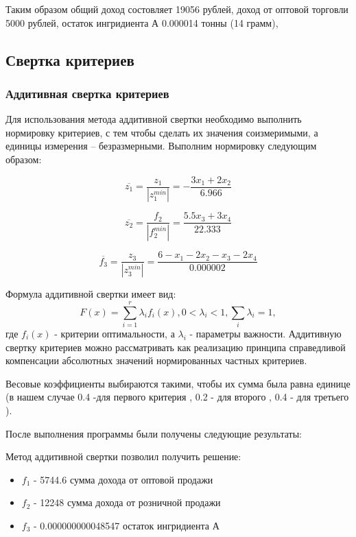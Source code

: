 \documentclass[14pt,a4paper,report]{report}
\begin{document}
Таким образом общий доход состовляет 19056 рублей, доход от оптовой торговли 5000 рублей, остаток ингридиента А 0.000014 тонны (14 грамм),




\subsection{Свертка критериев}
\subsubsection{Аддитивная свертка критериев}
Для использования метода аддитивной свертки необходимо выполнить нормировку критериев, с тем чтобы сделать их значения соизмеримыми, а единицы измерения – безразмерными. Выполним нормировку следующим образом:


    
    
\begin{equation}
\overline{z_1} = \frac{z_1}{|z_1^{min}|} =
-\frac{3x_1 + 2x_2}{6.966}
\end{equation}

\begin{equation}
\overline{z_2} = \frac{f_2}{|f_2^{min}|} = \frac{5.5x_3 + 3x_4} {22.333} 
\end{equation}

\begin{equation}
\overline{f_3} = \frac{z_3}{|z_3^{min}|} = \frac{6 - x_1 - 2x_2 - x_3 - 2x_4 }{0.000002} 
\end{equation}

Формула аддитивной свертки имеет вид:
\begin{equation}
F(x) = \sum_{i=1}^{r}\lambda_i f_i(x), 0<\lambda_i<1, \sum_i^{}\lambda_i=1,
\end{equation}
где $f_i(x)$ - критерии оптимальности, а $\lambda_i$ - параметры важности. 
Аддитивную свертку критериев можно рассматривать как реализацию принципа справедливой компенсации абсолютных значений нормированных частных критериев.

Весовые коэффициенты  выбираются такими, чтобы их сумма была равна единице (в нашем случае 0.4 -для первого критерия , 0.2 - для второго , 0.4 - для третьего ).



После выполнения программы были получены следующие результаты:



Метод аддитивной свертки позволил получить решение:
\begin{itemize}
\item $f_1$ - 5744.6 сумма дохода от оптовой продажи
\item $f_2$ - 12248 сумма дохода от розничной продажи
\item $f_3$ - 0.000000000048547 остаток ингридиента А
\end{itemize}
\end{document}
